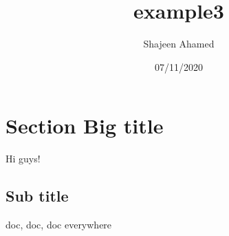 \documentclass{article}
\title{example3}
\author{Shajeen Ahamed}
\date{07/11/2020}
\begin{document}
\maketitle
\newpage
{}

\section{Section Big title}
				Hi guys!

\subsection{Sub title}
				doc, doc, doc everywhere
\end{document}
